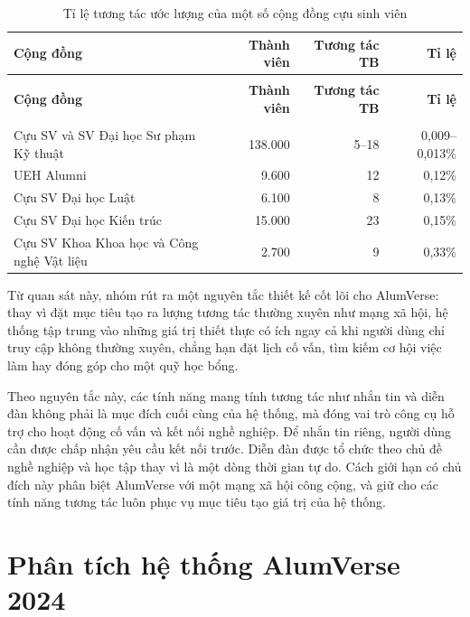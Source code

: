 \documentclass[12pt,a4paper,oneside]{report}
\begin{document}
\renewcommand{\arraystretch}{1.25}
{\small
\begin{longtable}{|>{\raggedright\arraybackslash}p{6.4cm}|r|r|r|}
\caption{Tỉ lệ tương tác ước lượng của một số cộng đồng cựu sinh viên}\label{tab:engagement}\\
\hline \textbf{Cộng đồng} & \textbf{Thành viên} & \textbf{Tương tác TB} & \textbf{Tỉ lệ} \\ \hline
\endfirsthead
\multicolumn{4}{l}{\itshape\small (tiếp theo trang trước)}\\[2pt]
\hline \textbf{Cộng đồng} & \textbf{Thành viên} & \textbf{Tương tác TB} & \textbf{Tỉ lệ} \\ \hline
\endhead
\hline \multicolumn{4}{r}{\itshape\small (còn tiếp)}\\
\endfoot
\hline
\endlastfoot
Cựu SV và SV Đại học Sư phạm Kỹ thuật & 138.000 & 5--18 & 0,009--0,013\% \\ \hline
UEH Alumni & 9.600 & 12 & 0,12\% \\ \hline
Cựu SV Đại học Luật & 6.100 & 8 & 0,13\% \\ \hline
Cựu SV Đại học Kiến trúc & 15.000 & 23 & 0,15\% \\ \hline
Cựu SV Khoa Khoa học và Công nghệ Vật liệu & 2.700 & 9 & 0,33\% \\ \hline
\end{longtable}
}
\renewcommand{\arraystretch}{1}

Từ quan sát này, nhóm rút ra một nguyên tắc thiết kế cốt lõi cho AlumVerse: thay vì đặt mục tiêu tạo ra lượng tương tác thường xuyên như mạng xã hội, hệ thống tập trung vào những giá trị thiết thực có ích ngay cả khi người dùng chỉ truy cập không thường xuyên, chẳng hạn đặt lịch cố vấn, tìm kiếm cơ hội việc làm hay đóng góp cho một quỹ học bổng.

Theo nguyên tắc này, các tính năng mang tính tương tác như nhắn tin và diễn đàn không phải là mục đích cuối cùng của hệ thống, mà đóng vai trò công cụ hỗ trợ cho hoạt động cố vấn và kết nối nghề nghiệp. Để nhắn tin riêng, người dùng cần được chấp nhận yêu cầu kết nối trước. Diễn đàn được tổ chức theo chủ đề nghề nghiệp và học tập thay vì là một dòng thời gian tự do. Cách giới hạn có chủ đích này phân biệt AlumVerse với một mạng xã hội công cộng, và giữ cho các tính năng tương tác luôn phục vụ mục tiêu tạo giá trị của hệ thống.

\section{Phân tích hệ thống AlumVerse 2024}
\end{document}
